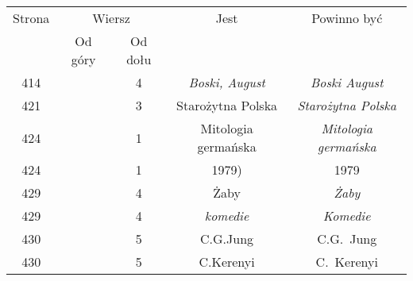 \documentclass[a4paper,11pt]{article}
\numberwithin{equation}{section}
\begin{document}
\begin{center}
  \begin{tabular}{|c|c|c|c|c|}
    \hline
    Strona & \multicolumn{2}{c|}{Wiersz} & Jest
                              & Powinno być \\ \cline{2-3}
    & Od góry & Od dołu & & \\
    \hline
    414 & & \hphantom{0}4 & \textit{Boski, August}
    & \textit{Boski August} \\
    421 & & \hphantom{0}3 & Starożytna Polska
    & \textit{Starożytna Polska} \\
    424 & & \hphantom{0}1 & Mitologia germańska
    & \textit{Mitologia germańska} \\
    424 & & \hphantom{0}1 & 1979) & 1979 \\
    429 & & \hphantom{0}4 & Żaby & \textit{Żaby} \\
    429 & & \hphantom{0}4 & \textit{komedie} & \textit{Komedie} \\
    430 & & \hphantom{0}5 & C.G.Jung & C.G.~Jung \\
    430 & & \hphantom{0}5 & C.Kerenyi & C.~Kerenyi \\
    \hline
  \end{tabular}






\end{center}
\end{document}
